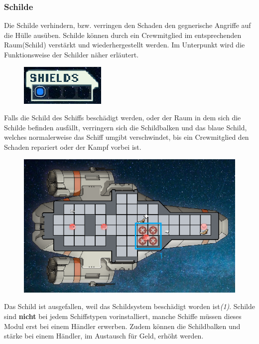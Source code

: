 \documentclass[fontsize=12pt,paper=a4,twoside]{scrartcl}
\begin{document}
\subsubsection{Schilde}
Die Schilde verhindern, bzw. verringen den Schaden den gegnerische Angriffe auf die Hülle ausüben. Schilde können durch ein Crewmitglied im entsprechenden Raum(Schild) verstärkt und wiederhergestellt werden. Im Unterpunkt  wird die Funktionsweise der Schilder näher erläutert.
\begin{figure}[H]
\centering
\includegraphics[width=0.4\linewidth]{DasSpiel/Ui/shield.png}
\end{figure}
Falls die Schild des Schiffs beschädigt werden, oder der Raum in dem sich die Schilde befinden ausfällt, verringern sich die Schildbalken und das blaue Schild, welches normalerweise das Schiff umgibt verschwindet, bis ein Crewmitglied den Schaden repariert oder der Kampf vorbei ist.

\begin{figure}[H]
\centering
\includegraphics[width=0.9\linewidth]{DasSpiel/Ui/shield_off.png}
\end{figure}

Das Schild ist ausgefallen, weil das Schildsystem beschädigt worden ist\textit{(1)}. Schilde sind \textbf{nicht} bei jedem Schiffstypen vorinstalliert, manche Schiffe müssen dieses Modul erst bei einem Händler erwerben. Zudem können die Schildbalken und stärke bei einem Händler, im Austausch für Geld, erhöht werden.  
\end{document}

